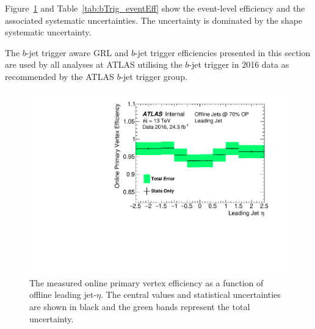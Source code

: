 Figure~\ref{fig:bTrig_eventSys} and Table~\ref{tab:bTrig_eventEff}
show the event-level efficiency and the associated systematic uncertainties.
The uncertainty is dominated by the shape systematic uncertainty.

The $b$-jet trigger aware GRL and $b$-jet trigger efficiencies presented in this section
are used by all analyses at ATLAS utilising the $b$-jet trigger in 2016 data as recommended by the ATLAS $b$-jet trigger group.


\begin{figure}[!ht]
  \begin{center}
    \includegraphics[width=0.8\linewidth, angle=0]{figs/Trigger/fullSyst_EventEfficiency_leadingJetEta.pdf}
  \end{center}
  \vspace{-1em}
  \caption[The measured online primary vertex efficiency as a function of offline leading jet-$\eta$.]
          {
    The measured online primary vertex efficiency as a function of offline leading jet-$\eta$.
    The central values and statistical uncertainties are shown in black and the green bands represent the total uncertainty.}
    \label{fig:bTrig_eventSys}
\end{figure}


